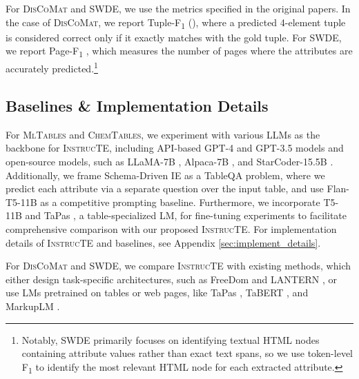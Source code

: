 \documentclass[11pt]{article}
\newcommand\method{\textsc{InstrucTE}}
\newcommand\data{\textsc{MlTables}}
\newcommand{\chemtables}{\textsc{ChemTables}}
\newcommand{\discomat}{\textsc{DisCoMat}}
\begin{document}
For \discomat{} and SWDE, we use the metrics specified in the original papers. In the case of \discomat{}, we report Tuple-F\textsubscript{1} (\citealp{gupta2022discomat}), where a predicted 4-element tuple is considered correct only if it exactly matches with the gold tuple. For SWDE,  we report Page-F\textsubscript{1} \citep{swde}, which measures the number of pages where the attributes are accurately predicted.\footnote{Notably, SWDE primarily focuses on identifying textual HTML nodes containing attribute values rather than exact text spans, so we use token-level F\textsubscript{1} to identify the most relevant HTML node for each extracted attribute.} 











\subsection{Baselines \& Implementation Details}
\label{sec:baseline}

For \data{} and \chemtables{}, we experiment with various LLMs as the backbone for \method{}, including API-based GPT-4 and GPT-3.5 models and open-source models, such as LLaMA-7B \citep{touvron2023llama}, Alpaca-7B \citep{alpaca}, and StarCoder-15.5B \citep{starcoder}.
Additionally, we frame Schema-Driven IE as a TableQA problem, where we predict each attribute via a separate question over the input table, 
and use Flan-T5-11B \citep{flant5} as a competitive prompting baseline. 
Furthermore, we incorporate T5-11B \citep{t5} and TaPas \citep{herzig-etal-2020-tapas}, a table-specialized LM, for fine-tuning experiments to facilitate comprehensive comparison with our proposed \method{}. For implementation details of \method{} and baselines, see Appendix \ref{sec:implement_details}.







For \discomat{} and SWDE, we compare \method{} with existing methods, which either design task-specific architectures, such as FreeDom \citep{freedom} and LANTERN \citep{lantern}, or use LMs pretrained on tables or web pages, like TaPas \citep{herzig-etal-2020-tapas}, TaBERT \cite{yin2020tabert}, and MarkupLM \citep{li-etal-2022-markuplm}. 
\end{document}
